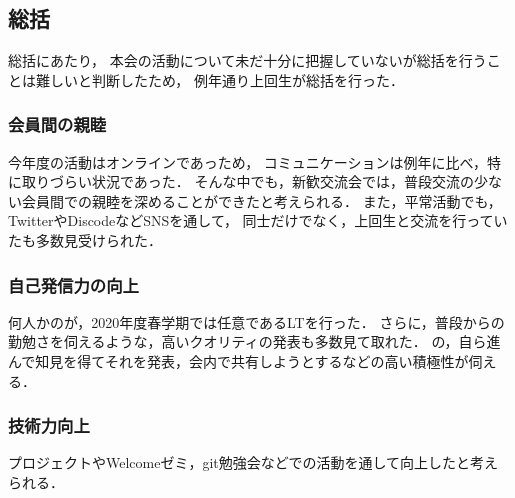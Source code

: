 \subsection*{\firstGrade{}総括}



\firstGrade{}総括にあたり，
本会の活動について未だ十分に把握していない\firstGrade{}が総括を行うことは難しいと判断したため，
例年通り上回生が総括を行った．


\subsubsection*{会員間の親睦}
今年度の活動はオンラインであっため，
コミュニケーションは例年に比べ，特に取りづらい状況であった．
そんな中でも，新歓交流会では，普段交流の少ない会員間での親睦を深めることができたと考えられる．
また，平常活動でも，TwitterやDiscodeなどSNSを通して，
\firstGrade{}同士だけでなく，上回生と交流を行っていた\firstGrade{}も多数見受けられた．


\subsubsection*{自己発信力の向上}
何人かの\firstGrade{}が，2020年度春学期では任意であるLTを行った．
さらに，普段からの勤勉さを伺えるような，高いクオリティの発表も多数見て取れた．
\firstGrade{}の，自ら進んで知見を得てそれを発表，会内で共有しようとするなどの高い積極性が伺える．


\subsubsection*{技術力向上}
プロジェクトやWelcomeゼミ，git勉強会などでの活動を通して向上したと考えられる．

